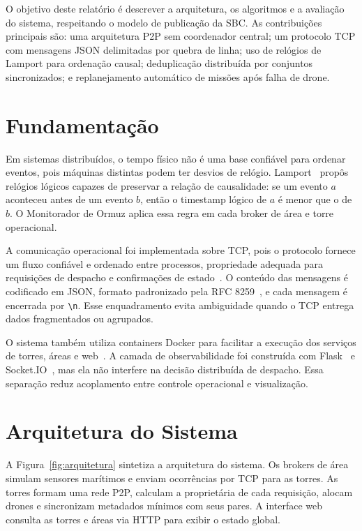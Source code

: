 \documentclass[12pt]{article}
\begin{document}
O objetivo deste relatório é descrever a arquitetura, os algoritmos e a avaliação do sistema, respeitando o modelo de publicação da SBC. As contribuições principais são: uma arquitetura P2P sem coordenador central; um protocolo TCP com mensagens JSON delimitadas por quebra de linha; uso de relógios de Lamport para ordenação causal; deduplicação distribuída por conjuntos sincronizados; e replanejamento automático de missões após falha de drone.

\section{Fundamentação}

Em sistemas distribuídos, o tempo físico não é uma base confiável para ordenar eventos, pois máquinas distintas podem ter desvios de relógio. Lamport~\cite{lamport1978time} propôs relógios lógicos capazes de preservar a relação de causalidade: se um evento $a$ aconteceu antes de um evento $b$, então o timestamp lógico de $a$ é menor que o de $b$. O Monitorador de Ormuz aplica essa regra em cada broker de área e torre operacional.

A comunicação operacional foi implementada sobre TCP, pois o protocolo fornece um fluxo confiável e ordenado entre processos, propriedade adequada para requisições de despacho e confirmações de estado~\cite{rfc9293}. O conteúdo das mensagens é codificado em JSON, formato padronizado pela RFC 8259~\cite{rfc8259}, e cada mensagem é encerrada por \texttt{\textbackslash n}. Esse enquadramento evita ambiguidade quando o TCP entrega dados fragmentados ou agrupados.

O sistema também utiliza containers Docker para facilitar a execução dos serviços de torres, áreas e web~\cite{docker2024}. A camada de observabilidade foi construída com Flask~\cite{grinberg2018flask} e Socket.IO~\cite{socketio2024}, mas ela não interfere na decisão distribuída de despacho. Essa separação reduz acoplamento entre controle operacional e visualização.

\section{Arquitetura do Sistema}

A Figura~\ref{fig:arquitetura} sintetiza a arquitetura do sistema. Os brokers de área simulam sensores marítimos e enviam ocorrências por TCP para as torres. As torres formam uma rede P2P, calculam a proprietária de cada requisição, alocam drones e sincronizam metadados mínimos com seus pares. A interface web consulta as torres e áreas via HTTP para exibir o estado global.
\end{document}
